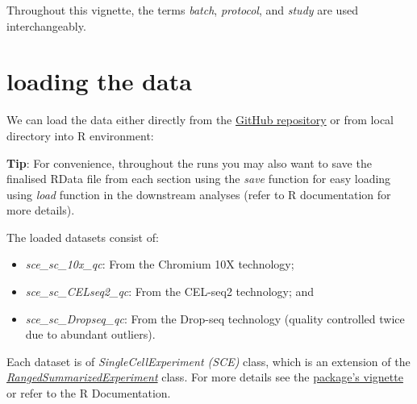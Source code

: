 \documentclass[]{book}
\newenvironment{Shaded}{\begin{snugshade}}{\end{snugshade}}
\newcommand{\CommentTok}[1]{\textcolor[rgb]{0.56,0.35,0.01}{\textit{#1}}}
\newcommand{\ControlFlowTok}[1]{\textcolor[rgb]{0.13,0.29,0.53}{\textbf{#1}}}
\newcommand{\KeywordTok}[1]{\textcolor[rgb]{0.13,0.29,0.53}{\textbf{#1}}}
\newcommand{\NormalTok}[1]{#1}
\newcommand{\OperatorTok}[1]{\textcolor[rgb]{0.81,0.36,0.00}{\textbf{#1}}}
\newcommand{\StringTok}[1]{\textcolor[rgb]{0.31,0.60,0.02}{#1}}
\providecommand{\tightlist}{%
  \setlength{\itemsep}{0pt}\setlength{\parskip}{0pt}}
\theoremstyle{definition}
\theoremstyle{definition}
\theoremstyle{definition}
\theoremstyle{remark}
\begin{document}
Throughout this vignette, the terms \emph{batch}, \emph{protocol}, and
\emph{study} are used interchangeably.

\hypertarget{loading-the-data}{%
\section{loading the data}\label{loading-the-data}}

We can load the data either directly from the
\href{https://github.com/LuyiTian/CellBench_data/tree/master/data}{GitHub
repository} or from local directory into R environment:

\begin{Shaded}
\end{Shaded}

\textbf{Tip}: For convenience, throughout the runs you may also want to
save the finalised RData file from each section using the \emph{save}
function for easy loading using \emph{load} function in the downstream
analyses (refer to R documentation for more details).

The loaded datasets consist of:

\begin{itemize}
\tightlist
\item
  \emph{sce\_sc\_10x\_qc}: From the Chromium 10X technology;
\item
  \emph{sce\_sc\_CELseq2\_qc}: From the CEL-seq2 technology; and
\item
  \emph{sce\_sc\_Dropseq\_qc}: From the Drop-seq technology (quality
  controlled twice due to abundant outliers).
\end{itemize}

Each dataset is of \emph{SingleCellExperiment (SCE)} class, which is an
extension of the
\href{https://www.rdocumentation.org/packages/SummarizedExperiment/versions/1.2.3/topics/RangedSummarizedExperiment-class}{\emph{RangedSummarizedExperiment}}
class. For more details see the
\href{https://bioconductor.org/packages/devel/bioc/vignettes/SingleCellExperiment/inst/doc/intro.html}{package's
vignette} or refer to the R Documentation.
\end{document}
